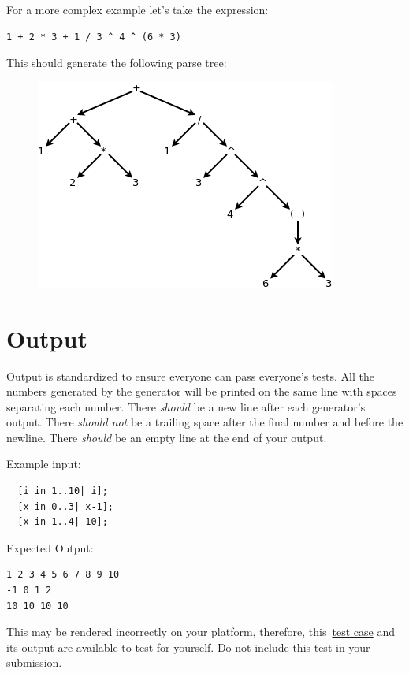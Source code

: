 \documentclass{article}
\begin{document}
For a more complex example let's take the expression:
\begin{lstlisting}
1 + 2 * 3 + 1 / 3 ^ 4 ^ (6 * 3)
\end{lstlisting}

This should generate the following parse tree:
\begin{figure}[H]
  \centering
  \includegraphics{static/assoc-example.png}
\end{figure}

\section{Output}
Output is standardized to ensure everyone can pass everyone's tests. All the numbers generated by
the generator will be printed on the same line with spaces separating each number. There
\textit{should} be a new line after each generator's output. There \textit{should not} be a
trailing space after the final number and before the newline. There \textit{should} be an empty
line at the end of your output.

Example input:
\begin{lstlisting}
  [i in 1..10| i];
  [x in 0..3| x-1];
  [x in 1..4| 10];
\end{lstlisting}

Expected Output:
\begin{lstlisting}
1 2 3 4 5 6 7 8 9 10
-1 0 1 2
10 10 10 10
\end{lstlisting}

This may be rendered incorrectly on your platform, therefore, this\
\href{https://webdocs.cs.ualberta.ca/\%7Ec415/generator/static/ex.in} {test case} and its
\href{https://webdocs.cs.ualberta.ca/\%7Ec415/generator/static/ex.out} {output} are available to
test for yourself. Do not include this test in your submission.
\end{document}
